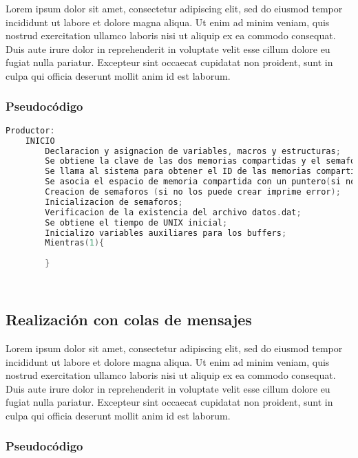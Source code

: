 Lorem ipsum dolor sit amet, consectetur adipiscing elit, sed do eiusmod tempor incididunt ut labore et dolore magna aliqua. Ut enim ad minim veniam, quis nostrud exercitation ullamco laboris nisi ut aliquip ex ea commodo consequat. Duis aute irure dolor in reprehenderit in voluptate velit esse cillum dolore eu fugiat nulla pariatur. Excepteur sint occaecat cupidatat non proident, sunt in culpa qui officia deserunt mollit anim id est laborum.\\

\subsubsection{Pseudocódigo}

\begin{lstlisting}[language=C]          % No usar tildes en el pseudocódigo
    Productor:
    INICIO
        Declaracion y asignacion de variables, macros y estructuras;
        Se obtiene la clave de las dos memorias compartidas y el semaforo (en el caso de que no las obtenga imprime error);
        Se llama al sistema para obtener el ID de las memorias compartidas (en el caso de que no las obtenga imprime error);
        Se asocia el espacio de memoria compartida con un puntero(si no puede asociar imprime error);
        Creacion de semaforos (si no los puede crear imprime error);
        Inicializacion de semaforos;
        Verificacion de la existencia del archivo datos.dat;
        Se obtiene el tiempo de UNIX inicial;
        Inicializo variables auxiliares para los buffers;
        Mientras(1){
        
        }
    
    
\end{lstlisting}

\subsection{Realización con colas de mensajes}

Lorem ipsum dolor sit amet, consectetur adipiscing elit, sed do eiusmod tempor incididunt ut labore et dolore magna aliqua. Ut enim ad minim veniam, quis nostrud exercitation ullamco laboris nisi ut aliquip ex ea commodo consequat. Duis aute irure dolor in reprehenderit in voluptate velit esse cillum dolore eu fugiat nulla pariatur. Excepteur sint occaecat cupidatat non proident, sunt in culpa qui officia deserunt mollit anim id est laborum.\\

\subsubsection{Pseudocódigo}

